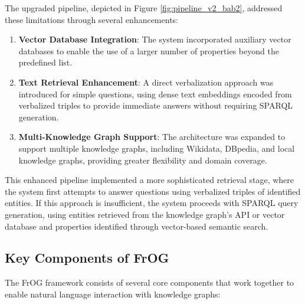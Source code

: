 The upgraded pipeline, depicted in Figure \ref{fig:pipeline_v2_bab2}, addressed these limitations through several enhancements:

\begin{enumerate}
    \item \textbf{Vector Database Integration}: The system incorporated auxiliary vector databases to enable the use of a larger number of properties beyond the predefined list.
    
    \item \textbf{Text Retrieval Enhancement}: A direct verbalization approach was introduced for simple questions, using dense text embeddings encoded from verbalized triples to provide immediate answers without requiring SPARQL generation.
    
    \item \textbf{Multi-Knowledge Graph Support}: The architecture was expanded to support multiple knowledge graphs, including Wikidata, DBpedia, and local knowledge graphs, providing greater flexibility and domain coverage.
\end{enumerate}

This enhanced pipeline implemented a more sophisticated retrieval stage, where the system first attempts to answer questions using verbalized triples of identified entities. If this approach is insufficient, the system proceeds with SPARQL query generation, using entities retrieved from the knowledge graph's API or vector database and properties identified through vector-based semantic search.

\subsection{Key Components of FrOG}
\label{sec:frog-components}
The FrOG framework consists of several core components that work together to enable natural language interaction with knowledge graphs:

